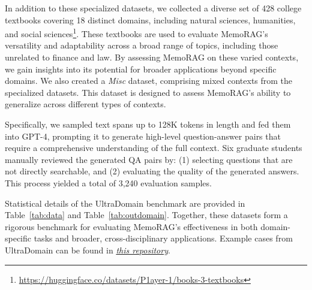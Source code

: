 \documentclass[sigconf]{acmart}
\begin{document}
In addition to these specialized datasets, we collected a diverse set of 428 college textbooks covering 18 distinct domains, including natural sciences, humanities, and social sciences\footnote{\url{https://huggingface.co/datasets/P1ayer-1/books-3-textbooks}}. These textbooks are used to evaluate MemoRAG’s versatility and adaptability across a broad range of topics, including those unrelated to finance and law. By assessing MemoRAG on these varied contexts, we gain insights into its potential for broader applications beyond specific domains.
We also created a \textit{Misc} dataset, comprising mixed contexts from the specialized datasets. This dataset is designed to assess MemoRAG’s ability to generalize across different types of contexts.


Specifically, we sampled text spans up to 128K tokens in length and fed them into GPT-4, prompting it to generate high-level question-answer pairs that require a comprehensive understanding of the full context. Six graduate students manually reviewed the generated QA pairs by: (1) selecting questions that are not directly searchable, and (2) evaluating the quality of the generated answers. This process yielded a total of 3,240 evaluation samples.

Statistical details of the UltraDomain benchmark are provided in Table~\ref{tab:data} and Table~\ref{tab:outdomain}. Together, these datasets form a rigorous benchmark for evaluating MemoRAG’s effectiveness in both domain-specific tasks and broader, cross-disciplinary applications. Example cases from UltraDomain can be found in \href{https://huggingface.co/datasets/TommyChien/UltraDomain}{\textit{this repository}}.
\end{document}

